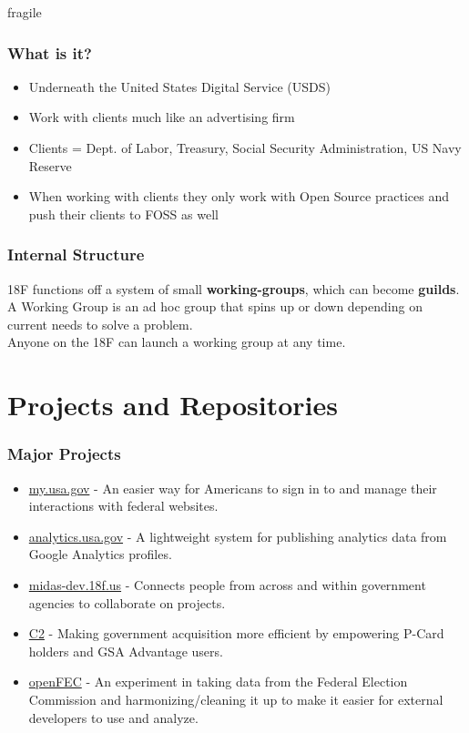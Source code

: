 \documentclass[10pt, compress]{beamer}
\begin{document}
\begin{frame}{fragile}
    \frametitle{What is it?}
    \begin{itemize}
    \item Underneath the United States Digital Service (USDS)
    \item Work with clients much like an advertising firm
    \item Clients = Dept. of Labor, Treasury, Social Security Administration, US Navy         Reserve
    \item When working with clients they only work with Open Source practices and push         their clients to FOSS as well
    \end{itemize}
    
\end{frame}

\begin{frame}[fragile]
  \frametitle{Internal Structure}

18F functions off a system of small \textbf{working-groups}, which can become \textbf{guilds}.
\vspace*{3mm} \\
A Working Group is an ad hoc group that spins up or down depending on current needs to solve a problem.
\vspace*{3mm} \\
Anyone on the 18F can launch a working group at any time.
\end{frame}


\section{Projects and Repositories}

\begin{frame}[fragile]
  \frametitle{Major Projects}
  \begin{itemize}
    \item \alert{\href{https://my.usa.gov/}{my.usa.gov}} - An easier way for Americans to sign in to and manage their interactions with federal websites.
    \item \alert{\href{https://analytics.usa.gov/}{analytics.usa.gov}} - A lightweight system for publishing analytics data from Google Analytics profiles.
    \item \alert{\href{https://midas-dev.18f.us/}{midas-dev.18f.us}} -  Connects people from across and within government agencies to collaborate on projects.
    \item \alert{\href{https://18f.github.io/C2/}{C2}} - Making government acquisition more efficient by empowering P-Card holders and GSA Advantage users.
    \item \alert{\href{https://github.com/18F/openFEC}{openFEC}} - An experiment in taking data from the Federal Election Commission and harmonizing/cleaning it up to make it easier for external developers to use and analyze.

  \end{itemize}
\end{frame}
\end{document}
